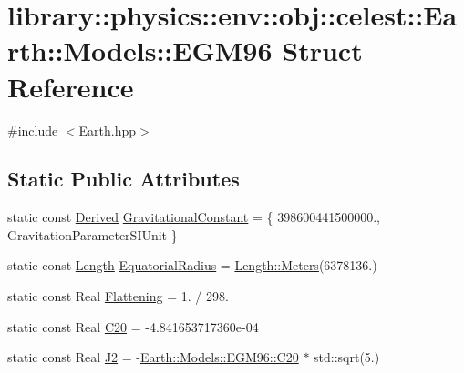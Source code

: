 \hypertarget{structlibrary_1_1physics_1_1env_1_1obj_1_1celest_1_1_earth_1_1_models_1_1_e_g_m96}{}\section{library\+:\+:physics\+:\+:env\+:\+:obj\+:\+:celest\+:\+:Earth\+:\+:Models\+:\+:E\+G\+M96 Struct Reference}
\label{structlibrary_1_1physics_1_1env_1_1obj_1_1celest_1_1_earth_1_1_models_1_1_e_g_m96}


{\ttfamily \#include $<$Earth.\+hpp$>$}

\subsection*{Static Public Attributes}
\begin{DoxyCompactItemize}
\item 
static const \hyperlink{classlibrary_1_1physics_1_1units_1_1_derived}{Derived} \hyperlink{structlibrary_1_1physics_1_1env_1_1obj_1_1celest_1_1_earth_1_1_models_1_1_e_g_m96_a204589f97a88e37c04c5b2f8a383cebd}{Gravitational\+Constant} = \{ 398600441500000., Gravitation\+Parameter\+S\+I\+Unit \}
\item 
static const \hyperlink{classlibrary_1_1physics_1_1units_1_1_length}{Length} \hyperlink{structlibrary_1_1physics_1_1env_1_1obj_1_1celest_1_1_earth_1_1_models_1_1_e_g_m96_a5f9d7b69bacc155c27ae36f6a7d3de6e}{Equatorial\+Radius} = \hyperlink{classlibrary_1_1physics_1_1units_1_1_length_ad523a3737d5c3f23a64588eac83f2148}{Length\+::\+Meters}(6378136.)
\item 
static const Real \hyperlink{structlibrary_1_1physics_1_1env_1_1obj_1_1celest_1_1_earth_1_1_models_1_1_e_g_m96_a809711e3370147668df2c97efba67e07}{Flattening} = 1. / 298.
\item 
static const Real \hyperlink{structlibrary_1_1physics_1_1env_1_1obj_1_1celest_1_1_earth_1_1_models_1_1_e_g_m96_a37ac9f9643bf74cc47fa23b102cecf34}{C20} = -\/4.\+841653717360e-\/04
\item 
static const Real \hyperlink{structlibrary_1_1physics_1_1env_1_1obj_1_1celest_1_1_earth_1_1_models_1_1_e_g_m96_a3c5d23e2538cbb0ddbb426e87c988349}{J2} = -\/\hyperlink{structlibrary_1_1physics_1_1env_1_1obj_1_1celest_1_1_earth_1_1_models_1_1_e_g_m96_a37ac9f9643bf74cc47fa23b102cecf34}{Earth\+::\+Models\+::\+E\+G\+M96\+::\+C20} $\ast$ std\+::sqrt(5.)
\end{DoxyCompactItemize}


